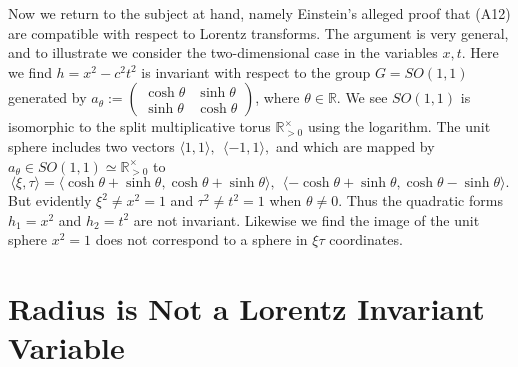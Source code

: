 \documentclass[12pt]{amsart}
\theoremstyle{definition}
\theoremstyle{remark}
\newcommand{\bR}{\mathbb{R}}
\newcommand{\del}{\partial}
\begin{document}
Now we return to the subject at hand, namely Einstein's alleged proof that (A12) are compatible with respect to Lorentz transforms. The argument is very general, and to illustrate we consider the two-dimensional case in the variables $x,t$. Here we find $h=x^2-c^2 t^2$ is invariant with respect to the group $G=SO(1,1)$ generated by $a_\theta:=\begin{pmatrix} \cosh \theta & \sinh \theta \\
\sinh \theta & \cosh \theta
\end{pmatrix}$, where $\theta\in \bR$. We see $SO(1,1)$ is isomorphic to the split multiplicative torus $\bR^\times _{>0}$ using the logarithm. The unit sphere includes two vectors $\langle 1, 1 \rangle,~~ \langle -1,1\rangle,$ and which are mapped by $a_\theta \in SO(1,1) \simeq \bR^\times_{>0}$ to $$\langle \xi,\tau\rangle=\langle \cosh \theta+\sinh \theta, \cosh \theta+\sinh \theta \rangle,~~ \langle -\cosh \theta+\sinh \theta, \cosh \theta-\sinh \theta \rangle.$$ But evidently $\xi^2 \neq x^2=1$ and $\tau^2 \neq t^2=1$ when $\theta\neq 0$. Thus the quadratic forms $h_1=x^2$ and $h_2=t^2$ are not invariant. Likewise we find the image of the unit sphere $x^2=1$ does not correspond to a sphere in $\xi \tau$ coordinates. %


\section{Radius is Not a Lorentz Invariant Variable}
\end{document}
